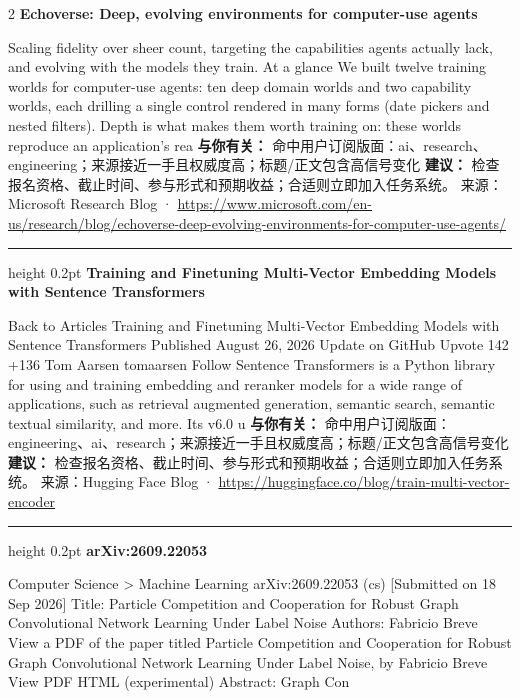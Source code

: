 \documentclass[10.5pt]{ctexart}
\begin{document}
\begin{multicols}{2}
{\large\bfseries Echoverse: Deep, evolving environments for computer-use agents}\par
Scaling fidelity over sheer count, targeting the capabilities agents actually lack, and evolving with the models they train. At a glance We built twelve training worlds for computer-use agents: ten deep domain worlds and two capability worlds, each drilling a single control rendered in many forms (date pickers and nested filters). Depth is what makes them worth training on: these worlds reproduce an application’s rea
\textbf{与你有关：} 命中用户订阅版面：ai、research、engineering；来源接近一手且权威度高；标题/正文包含高信号变化
\textbf{建议：} 检查报名资格、截止时间、参与形式和预期收益；合适则立即加入任务系统。
{\footnotesize\color{ormuted} 来源：Microsoft Research Blog · \url{https://www.microsoft.com/en-us/research/blog/echoverse-deep-evolving-environments-for-computer-use-agents/}}
\vspace{2mm}
\hrule height 0.2pt
\vspace{2mm}
{\large\bfseries Training and Finetuning Multi-Vector Embedding Models with Sentence Transformers}\par
Back to Articles Training and Finetuning Multi-Vector Embedding Models with Sentence Transformers Published August 26, 2026 Update on GitHub Upvote 142 +136 Tom Aarsen tomaarsen Follow Sentence Transformers is a Python library for using and training embedding and reranker models for a wide range of applications, such as retrieval augmented generation, semantic search, semantic textual similarity, and more. Its v6.0 u
\textbf{与你有关：} 命中用户订阅版面：engineering、ai、research；来源接近一手且权威度高；标题/正文包含高信号变化
\textbf{建议：} 检查报名资格、截止时间、参与形式和预期收益；合适则立即加入任务系统。
{\footnotesize\color{ormuted} 来源：Hugging Face Blog · \url{https://huggingface.co/blog/train-multi-vector-encoder}}
\vspace{2mm}
\hrule height 0.2pt
\vspace{2mm}
{\large\bfseries arXiv:2609.22053}\par
Computer Science > Machine Learning arXiv:2609.22053 (cs) [Submitted on 18 Sep 2026] Title: Particle Competition and Cooperation for Robust Graph Convolutional Network Learning Under Label Noise Authors: Fabricio Breve View a PDF of the paper titled Particle Competition and Cooperation for Robust Graph Convolutional Network Learning Under Label Noise, by Fabricio Breve View PDF HTML (experimental) Abstract: Graph Con

\end{multicols}
\end{document}
